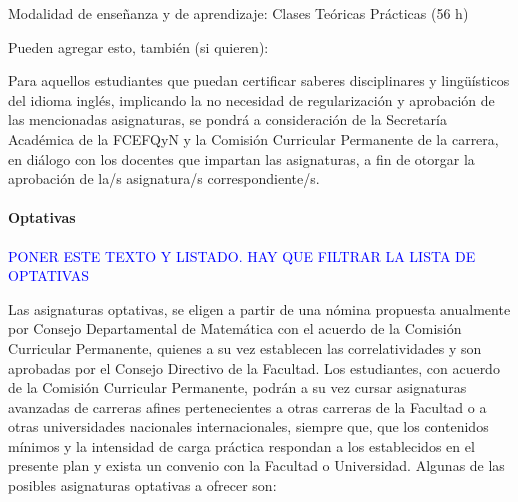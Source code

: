 \documentclass[a4paper, 12pt]{article}
\begin{document}
Modalidad de enseñanza y de aprendizaje: Clases Teóricas Prácticas (56 h)

 

Pueden agregar esto, también (si quieren):

 

Para aquellos estudiantes que puedan certificar saberes disciplinares y lingüísticos del idioma inglés, implicando la no necesidad de regularización y aprobación de las mencionadas asignaturas, se pondrá a consideración de la Secretaría Académica de la FCEFQyN y la Comisión Curricular Permanente de la carrera, en diálogo con los docentes que impartan las asignaturas, a fin de otorgar la aprobación de la/s asignatura/s correspondiente/s.

\paragraph{Optativas  }

\textcolor{blue}{PONER ESTE TEXTO Y LISTADO. HAY QUE FILTRAR LA LISTA DE OPTATIVAS}

Las asignaturas optativas, se eligen a partir de una nómina propuesta anualmente por Consejo Departamental de Matemática con el acuerdo de la Comisión Curricular Permanente, quienes a su vez establecen las correlatividades y son aprobadas por el Consejo Directivo de la Facultad. Los estudiantes, con acuerdo de la Comisión Curricular
Permanente, podrán a su vez cursar asignaturas avanzadas de carreras afines pertenecientes a otras carreras de la Facultad o a otras universidades nacionales internacionales, siempre que, que los contenidos mínimos y la intensidad de carga
práctica respondan a los establecidos en el presente plan y exista un convenio con la Facultad o Universidad.
Algunas de las posibles asignaturas optativas a ofrecer son:
\end{document}
